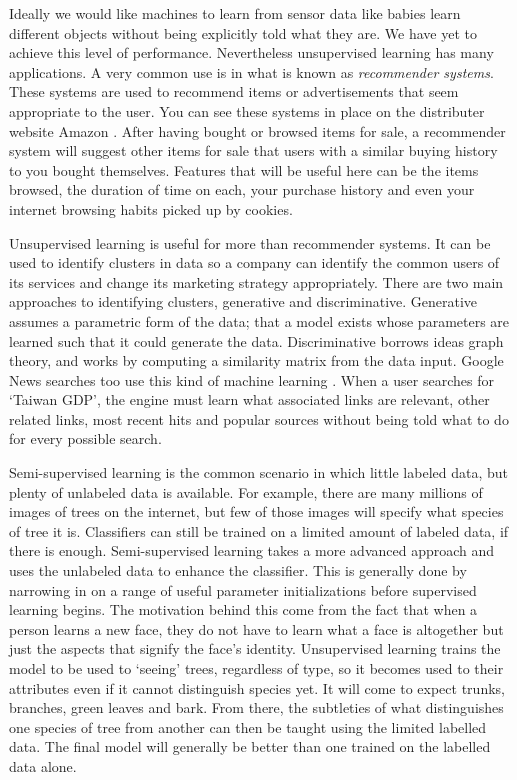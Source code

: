 Ideally we would like machines to learn from sensor data like babies learn different objects without being explicitly told what they are.
We have yet to achieve this level of performance.
Nevertheless unsupervised learning has many applications.
A very common use is in what is known as \textit{recommender systems}\citep{domingos2012few}.
These systems are used to recommend items or advertisements that seem appropriate to the user.
You can see these systems in place on the distributer website Amazon \citep{amazon}.
After having bought or browsed items for sale, a recommender system will suggest other items for sale that users with a similar buying history to you bought themselves.
Features that will be useful here can be the items browsed, the duration of time on each, your purchase history and even your internet browsing habits picked up by cookies.

Unsupervised learning is useful for more than recommender systems.
It can be used to identify clusters in data so a company can identify the common users of its services and change its marketing strategy appropriately.
There are two main approaches to identifying clusters, generative and discriminative\citep{sammut2011encyclopedia}.
Generative assumes a parametric form of the data; that a model exists whose parameters are learned such that it could generate the data.
Discriminative borrows ideas graph theory, and works by computing a similarity matrix from the data input.
Google News searches too use this kind of machine learning \citep{das2007google}.
When a user searches for `Taiwan GDP', the engine must learn what associated links are relevant, other related links, most recent hits and popular sources without being told what to do for every possible search.


Semi-supervised learning is the common scenario in which little labeled data, but plenty of unlabeled data is available.
For example, there are many millions of images of trees on the internet, but few of those images will specify what species of tree it is.
Classifiers can still be trained on a limited amount of labeled data, if there is enough.
Semi-supervised learning takes a more advanced approach and uses the unlabeled data to enhance the classifier. 
This is generally done by narrowing in on a range of useful parameter initializations before supervised learning begins.
The motivation behind this come from the fact that when a person learns a new face, they do not have to learn what a face is altogether but just the aspects that signify the face's identity.
Unsupervised learning trains the model to be used to `seeing' trees, regardless of type, so it becomes used to their attributes even if it cannot distinguish species yet.
It will come to expect trunks, branches, green leaves and bark.
From there, the subtleties of what distinguishes one species of tree from another can then be taught using the limited labelled data.
The final model will generally be better than one trained on the labelled data alone.

